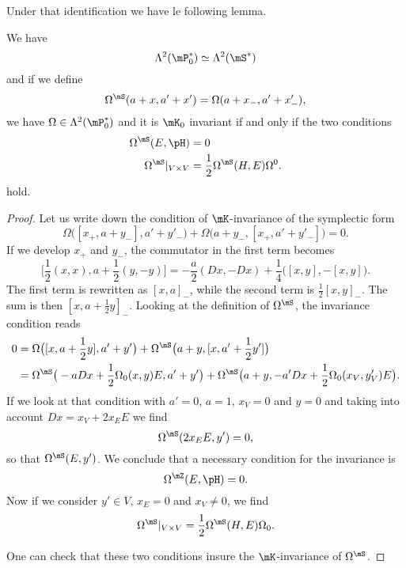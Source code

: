 Under that identification we have le following lemma.
\begin{lemma}
	We have
	\begin{equation}
		\Lambda^2(\mP_0^*)\simeq\Lambda^2(\mS^*)
	\end{equation}
	and if we define
	\begin{equation}
		\Omega^{\mS}(a+x,a'+x')=\Omega(a+x_-,a'+x'_-),
	\end{equation}
	we have $\Omega\in\Lambda^2(\mP_0^*)$ and it is $\mK_0$ invariant if and only if the two conditions
	\begin{equation}
		\begin{aligned}[]
			\Omega^{\mS}(E,\pH)&=0\\
			\Omega^{\mS}|_{V\times V}&=\frac{ 1 }{2}\Omega^{\mS}(H,E)\Omega^0.
		\end{aligned}
	\end{equation}
	hold.
\end{lemma}

\begin{proof}
	Let us write down the condition of $\mK$-invariance of the symplectic form
	\begin{equation}
		\Omega\big( [x_+,a+y_-],a'+y'_- \big)+\Omega\big( a+y_-,[x_+,a'+y'_-] \big)=0.
	\end{equation}
	If we develop $x_+$ and $y_-$, the commutator in the first term becomes
	\begin{equation}
		\big[ \frac{ 1 }{2}(x,x),a+\frac{ 1 }{2}(y,-y) \big]=-\frac{ a }{2}(Dx,-Dx)+\frac{1}{ 4 }\big( [x,y],-[x,y] \big).
	\end{equation}
	The first term is rewritten as $[x,a]_-$, while the second term is $\frac{ 1 }{2}[x,y]_-$. The sum is then $[x,a+\frac{ 1 }{2}y]_-$. Looking at the definition of $\Omega^{\mS}$, the invariance condition reads
	\begin{equation}
		\begin{aligned}[]
			0&=\Omega\big( [x,a+\frac{ 1 }{2}y],a'+y' \big)+\Omega^{\mS}\big( a+y,[x,a'+\frac{ 1 }{2}y'] \big)\\
			&=\Omega^{\mS}\big( -a Dx+\frac{ 1 }{2}\Omega_0(x,y)E,a'+y' \big)+\Omega^{\mS}\big( a+y,-a'Dx+\frac{ 1 }{2}\Omega_0(x_V,y_V')E \big).
		\end{aligned}
	\end{equation}
	If we look at that condition with $a'=0$, $a=1$, $x_V=0$ and $y=0$ and taking into account $Dx=x_V+2x_EE$ we find
	\begin{equation}
		\Omega^{\mS}(2x_EE,y')=0,
	\end{equation}
	so that $\Omega^{\mS}(E,y')$. We conclude that a necessary condition for the invariance is
	\begin{equation}
		\Omega^{\mZ}(E,\pH)=0.
	\end{equation}
	Now if we consider $y'\in V$, $x_E=0$ and $x_V\neq 0$, we find
	\begin{equation}
		\Omega^{\mS}|_{V\times V}=\frac{ 1 }{2}\Omega^{\mS}(H,E)\Omega_0.
	\end{equation}
	
	One can check that these two conditions insure the $\mK$-invariance of $\Omega^{\mS}$.
\end{proof}

